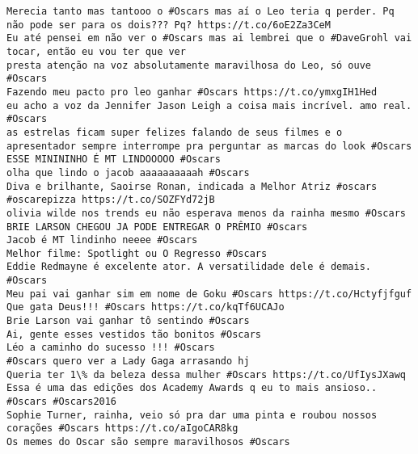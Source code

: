\begin{lstlisting}[style=text, frame=single]
Merecia tanto mas tantooo o #Oscars mas aí o Leo teria q perder. Pq não pode ser para os dois??? Pq? https://t.co/6oE2Za3CeM
Eu até pensei em não ver o #Oscars mas ai lembrei que o #DaveGrohl vai tocar, então eu vou ter que ver
presta atenção na voz absolutamente maravilhosa do Leo, só ouve #Oscars
Fazendo meu pacto pro leo ganhar #Oscars https://t.co/ymxgIH1Hed
eu acho a voz da Jennifer Jason Leigh a coisa mais incrível. amo real. #Oscars
as estrelas ficam super felizes falando de seus filmes e o apresentador sempre interrompe pra perguntar as marcas do look #Oscars
ESSE MINININHO É MT LINDOOOOO #Oscars
olha que lindo o jacob aaaaaaaaaah #Oscars
Diva e brilhante, Saoirse Ronan, indicada a Melhor Atriz #oscars #oscarepizza https://t.co/SOZFYd72jB
olivia wilde nos trends eu não esperava menos da rainha mesmo #Oscars
BRIE LARSON CHEGOU JA PODE ENTREGAR O PRÊMIO #Oscars
Jacob é MT lindinho neeee #Oscars
Melhor filme: Spotlight ou O Regresso #Oscars
Eddie Redmayne é excelente ator. A versatilidade dele é demais. #Oscars
Meu pai vai ganhar sim em nome de Goku #Oscars https://t.co/Hctyfjfguf
Que gata Deus!!! #Oscars https://t.co/kqTf6UCAJo
Brie Larson vai ganhar tô sentindo #Oscars
Ai, gente esses vestidos tão bonitos #Oscars
Léo a caminho do sucesso !!! #Oscars
#Oscars quero ver a Lady Gaga arrasando hj
Queria ter 1\% da beleza dessa mulher #Oscars https://t.co/UfIysJXawq
Essa é uma das edições dos Academy Awards q eu to mais ansioso.. #Oscars #Oscars2016
Sophie Turner, rainha, veio só pra dar uma pinta e roubou nossos corações #Oscars https://t.co/aIgoCAR8kg
Os memes do Oscar são sempre maravilhosos #Oscars
\end{lstlisting}

